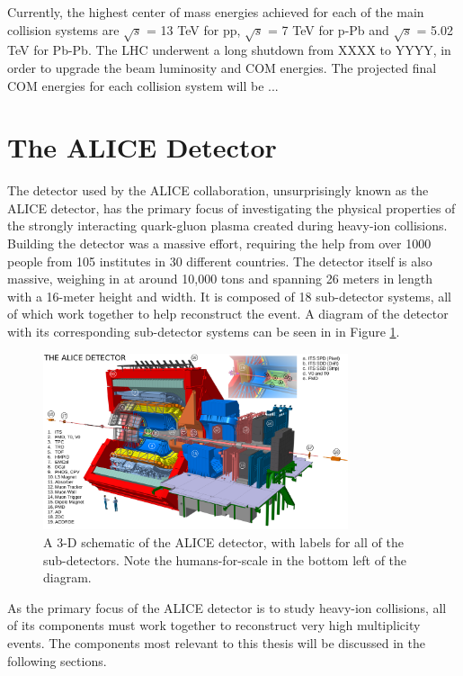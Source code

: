 Currently, the highest center of mass energies achieved for each of the main collision systems are $\sqrt{s}$ = 13 TeV for pp, $\sqrt{s}$ = 7 TeV for p-Pb and $\sqrt{s}$ = 5.02 TeV for Pb-Pb. 
The LHC underwent a long shutdown from XXXX to YYYY, in order to upgrade the beam luminosity and COM energies. 
The projected final COM energies for each collision system will be ... 

\section{The ALICE Detector}
The detector used by the ALICE collaboration, unsurprisingly known as the ALICE detector, has the primary focus of investigating the physical properties of the strongly interacting quark-gluon plasma created during heavy-ion collisions.
Building the detector was a massive effort, requiring the help from over 1000 people from 105 institutes in 30 different countries. 
The detector itself is also massive, weighing in at around 10,000 tons and spanning 26 meters in length with a 16-meter height and width.
It is composed of 18 sub-detector systems, all of which work together to help reconstruct the event.
A diagram of the detector with its corresponding sub-detector systems can be seen in in Figure \ref{fig:alice_detector}.
\begin{figure}
    \centering
    \includegraphics[width=0.8\textwidth]{figures/experiment/ALICE_detector_schematic.png}
    \caption{A 3-D schematic of the ALICE detector, with labels for all of the sub-detectors. Note the humans-for-scale in the bottom left of the diagram.}
    \label{fig:alice_detector}
\end{figure}
As the primary focus of the ALICE detector is to study heavy-ion collisions, all of its components must work together to reconstruct very high multiplicity events. The components most relevant to this thesis will be discussed in the following sections.


